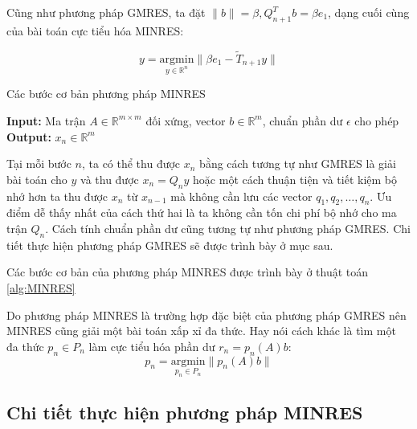 \documentclass[14pt, a4paper]{article}
\numberwithin{equation}{section}
\numberwithin{algorithm}{section}
\numberwithin{figure}{section}
\numberwithin{dl}{section}
\numberwithin{md}{section}
\numberwithin{bd}{section}
\numberwithin{dn}{section}
\begin{document}
Cũng như phương pháp GMRES, ta đặt $\lVert b \rVert= \beta, Q_{n+1}^T b=\beta e_1$, dạng cuối cùng của bài toán cực tiểu hóa MINRES:

\begin{equation}
    y = \underset{y \in \mathbb{R}^n}{\mathrm{argmin}} \lVert \beta e_1 - \widetilde{T}_{n+1} y \rVert 
\end{equation}



\begin{algorithm}[h!]
    \caption{Các bước cơ bản phương pháp MINRES}\label{alg:MINRES}
    \hspace*{\algorithmicindent} \textbf{Input:} {Ma trận $A \in \mathbb{R}^{m \times m}$ đối xứng, vector $b \in \mathbb{R}^m$, chuẩn phần dư $\epsilon$ cho phép} \\
    \hspace*{\algorithmicindent} \textbf{Output:} {$x_n \in \mathbb{R}^m$}
    \begin{algorithmic}
        \EndFor
    \end{algorithmic}
\end{algorithm}

Tại mỗi bước $n$, ta có thể thu được $x_n$ bằng cách tương tự như GMRES là giải bài toán cho $y$ và thu được $x_n = Q_n y$ hoặc một cách thuận tiện và tiết kiệm bộ nhớ hơn ta thu được $x_n$ từ $x_{n-1}$ mà không cần lưu các vector $q_1, q_2, \dots, q_n$. Ưu điểm dễ thấy nhất của cách thứ hai là ta không cần tốn chi phí bộ nhớ cho ma trận $Q_n$.
Cách tính chuẩn phần dư cũng tương tự như phương pháp GMRES. Chi tiết thực hiện phương pháp GMRES sẽ được trình bày ở mục sau.

Các bước cơ bản của phương pháp MINRES được trình bày ở thuật toán \ref{alg:MINRES}

Do phương pháp MINRES là trường hợp đặc biệt của phương pháp GMRES nên MINRES cũng giải một bài toán xấp xỉ đa thức. Hay nói cách khác là tìm một đa thức $p_n \in P_n$ làm cực tiểu hóa phần dư $r_n = p_n(A)b$:
\begin{equation}
    p_n = \underset{p_n \in P_n}{\mathrm{argmin}} \lVert p_n(A)b \rVert
\end{equation}

\subsection{Chi tiết thực hiện phương pháp MINRES} \label{MINRES-Detailed}
\end{document}
